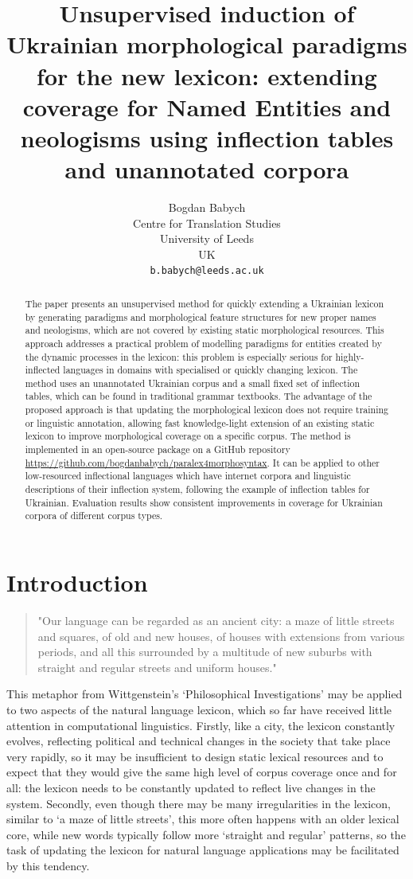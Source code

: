 \documentclass[11pt,a4paper]{article}
\title{Unsupervised induction of Ukrainian morphological paradigms for the new lexicon: extending coverage for Named Entities and neologisms using inflection tables and unannotated corpora}
\author{Bogdan Babych \\
  Centre for Translation Studies \\
  University of Leeds \\
  UK \\
  \texttt{b.babych@leeds.ac.uk} \\ }
\date{}
\begin{document}
\maketitle
\begin{abstract}
	The paper presents an unsupervised method for quickly extending a Ukrainian lexicon by generating paradigms and morphological feature structures for new proper names and neologisms, which are not covered by existing static morphological resources. This approach addresses a practical problem of modelling paradigms for entities created by the dynamic processes in the lexicon: this problem is especially serious for highly-inflected languages in  domains with specialised or quickly changing lexicon. The method uses an unannotated Ukrainian corpus and a small fixed set of inflection tables, which can be found in traditional grammar textbooks. The advantage of the proposed approach is that updating the morphological lexicon does not require training or linguistic annotation, allowing fast knowledge-light extension of an existing static lexicon to improve morphological coverage on a specific corpus. The method is implemented in an open-source package on a GitHub repository \url{https://github.com/bogdanbabych/paralex4morphosyntax}. It can be applied to other low-resourced inflectional languages which have internet corpora and linguistic descriptions of their inflection system, following the example of inflection tables for Ukrainian. Evaluation results show consistent improvements in coverage for Ukrainian corpora of different corpus types.
	

\end{abstract}


\section{Introduction}


\begin{quote}
	"Our language can be regarded as an ancient city: a maze of little streets and squares, of old and new houses, of houses with extensions from various periods, and all this surrounded by a multitude of new suburbs with straight and regular streets and uniform houses." \cite{Wittgenstein-2009}
\end{quote}
This metaphor from Wittgenstein's `Philosophical Investigations' may be applied to two aspects of the natural language lexicon, which so far have received little attention in computational linguistics. Firstly, like a city, the lexicon constantly evolves, reflecting political and technical changes in the society that take place very rapidly, so it may be insufficient to design static lexical resources and to expect that they would give the same high level of corpus coverage once and for all: the lexicon needs to be constantly updated to reflect live changes in the system. Secondly, even though there may be many irregularities in the lexicon, similar to `a maze of little streets', this more often happens with an older lexical core, while new words typically follow more `straight and regular' patterns, so the task of updating the lexicon for natural language applications may be facilitated by this tendency.
\end{document}
